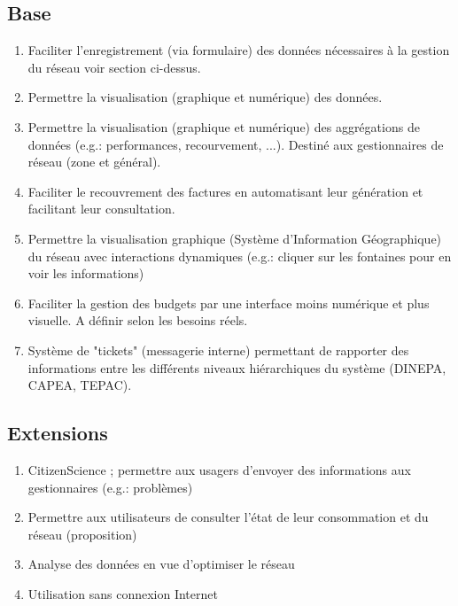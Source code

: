 \documentclass[a4paper, 11pt]{article}
\begin{document}
  \subsection{Base}
  \begin{enumerate}
    \item Faciliter l'enregistrement (via formulaire) des données nécessaires à la gestion du réseau voir section ci-dessus.
    \item Permettre la visualisation (graphique et numérique) des données.
    \item Permettre la visualisation (graphique et numérique) des aggrégations de données (e.g.: performances, recourvement, ...). Destiné aux gestionnaires de réseau (zone et général).
    \item Faciliter le recouvrement des factures en automatisant leur génération et facilitant leur consultation.
    \item Permettre la visualisation graphique (Système d'Information Géographique) du réseau avec interactions dynamiques (e.g.: cliquer sur les fontaines pour en voir les informations)
    \item Faciliter la gestion des budgets par une interface moins numérique et plus visuelle. A définir selon les besoins réels.
    \item Système de "tickets" (messagerie interne) permettant de rapporter des informations entre les différents niveaux hiérarchiques du système (DINEPA, CAPEA, TEPAC).
  \end{enumerate}
  \subsection{Extensions}
  \begin{enumerate}
    \item CitizenScience ; permettre aux usagers d'envoyer des informations aux gestionnaires (e.g.: problèmes)
    \item Permettre aux utilisateurs de consulter l'état de leur consommation et du réseau (proposition)
    \item Analyse des données en vue d'optimiser le réseau
    \item Utilisation sans connexion Internet
  \end{enumerate}
\end{document}
